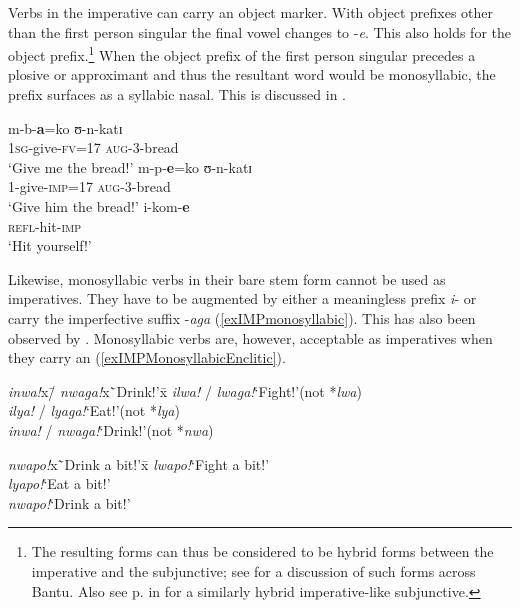 Verbs in the imperative can carry an object marker. With object prefixes other than the first person singular the final vowel changes to -\textit{e}. This also holds for the  object prefix.\footnote{The resulting forms can thus be considered to be hybrid forms between the imperative and the subjunctive; see \citet[17--22]{DevosVanOlmen2013} for a discussion of such forms across Bantu. Also see p.\nobreakspace\pageref{SUBJohneSM} in  for a similarly hybrid imperative-like subjunctive.} When the object prefix of the first person singular precedes a plosive or approximant and thus the resultant word would be monosyllabic, the prefix surfaces as a syllabic nasal. This is discussed in .
\begin{exe}
\ex\begin{xlist}
\ex\gll m-b-\textbf{a}=ko ʊ-n-katɪ \\
\textsc{1sg}-give-\textsc{fv}=17 \textsc{aug}-3-bread \\
\glt `Give me the bread!'
\ex \gll m-p-\textbf{e}=ko ʊ-n-katɪ \\
1-give-\textsc{imp}=17  \textsc{aug}-3-bread\\
\glt `Give him the bread!'
\ex \gll i-kom-\textbf{e}\\
\textsc{refl}-hit-\textsc{imp}\\
\glt `Hit yourself!'
\end{xlist}
\end{exe}

\label{ImperativesMonosyllabic} Likewise, monosyllabic verbs in their bare stem form cannot be used as imperatives. They have to be augmented by either a meaningless prefix \textit{i}- or carry the imperfective suffix \mbox{-\textit{aga}} (\ref{exIMPmonosyllabic}). This has also been observed by \citet[69]{SchumannK1899}. Monosyllabic verbs are, however, acceptable as imperatives when they carry an  (\ref{exIMPMonosyllabicEnclitic}).
\begin{exe}
\ex\label{exIMPmonosyllabic}
\begin{tabbing}
\textit{inwa!}x\= / \textit{nwaga!}x\=`Drink!'x\=\kill
\textit{ilwa!}\> / \textit{lwaga!}\>`Fight!'\>(not *\textit{lwa})
\\\textit{ilya!}\> / \textit{lyaga!}\>`Eat!'\>(not *\textit{lya})
\\\textit{inwa!}\> / \textit{nwaga!}\>`Drink!'\>(not *\textit{nwa})
\end{tabbing}
\ex \label{exIMPMonosyllabicEnclitic}
\begin{tabbing}
\textit{nwapo!}x\=`Drink a bit!'x\=\kill
\textit{lwapo!}\>`Fight a bit!'\\
\textit{lyapo!}\>`Eat a bit!' \\
\textit{nwapo!}\>`Drink a bit!'
 \end{tabbing}
\end{exe}

